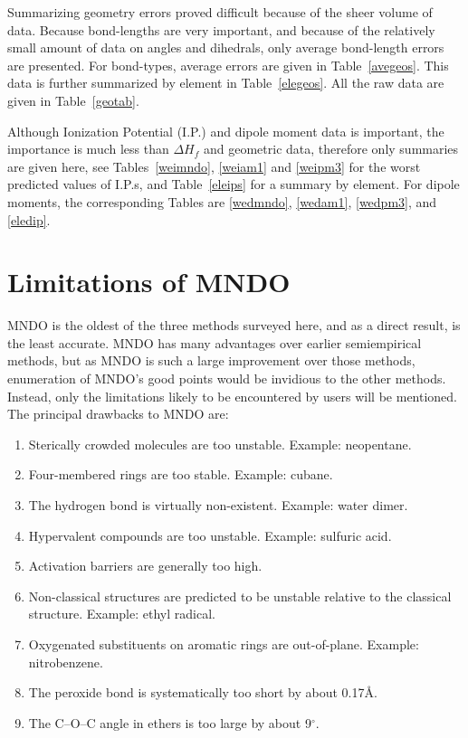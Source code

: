 Summarizing geometry errors proved difficult because of the sheer volume of
data. Because bond-lengths are very important, and because of the relatively
small amount of data on angles and dihedrals, only average bond-length errors
are presented. For bond-types, average errors are given in
Table~\ref{avegeos}.  This data is further summarized by element in
Table~\ref{elegeos}.  All the raw data are given in Table~\ref{geotab}.

Although Ionization Potential (I.P.) and dipole moment data is important,  the
importance is much less than $\Delta H_f$ and geometric data, therefore only
summaries are given here, see Tables~\ref{weimndo}, \ref{weiam1} and
\ref{weipm3} for the worst predicted values of I.P.s,  and Table~\ref{eleips}
for a summary by element.  For dipole moments, the corresponding Tables are
\ref{wedmndo}, \ref{wedam1}, \ref{wedpm3}, and \ref{eledip}.

\section{Limitations of MNDO}
MNDO is the oldest of the three methods surveyed here, and as a direct result,
is the least accurate. MNDO has many advantages over earlier semiempirical
methods, but as MNDO is such a large improvement over those methods,
enumeration of MNDO's good points would be invidious to the other methods.
Instead, only the limitations likely to be encountered by users will be
mentioned. The principal drawbacks to MNDO are:
\begin{enumerate}
\item Sterically crowded molecules are too unstable.   Example: neopentane.
\item Four-membered rings are too stable.   Example: cubane.
\item The hydrogen bond is virtually non-existent.   Example: water dimer.
\item Hypervalent compounds are too unstable.   Example: sulfuric acid.
\item Activation barriers are generally too high.
\item Non-classical structures are predicted to be unstable relative to the 
classical structure.   Example: ethyl radical.
\item   Oxygenated substituents on aromatic rings are out-of-plane.   Example: 
nitrobenzene.
\item The peroxide bond is systematically too short by about 0.17\AA.
\item The C--O--C angle in ethers is too large by about 9$^\circ$. 
\end{enumerate}

